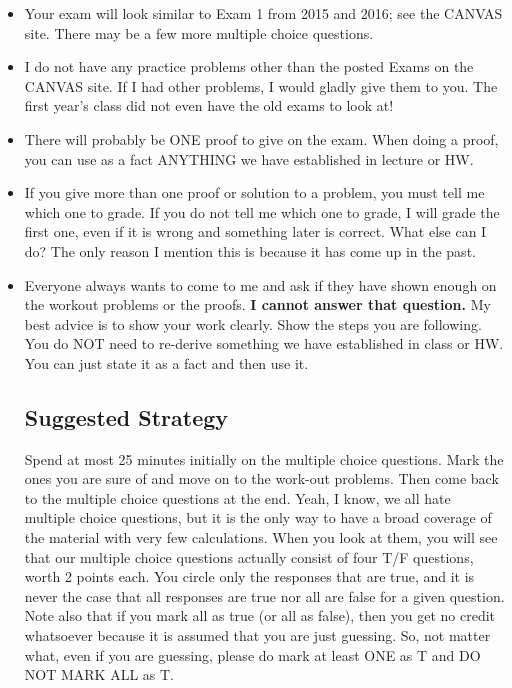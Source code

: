 \documentclass[letterpaper]{article}
\begin{document}
\begin{itemize}

\item Your exam will look similar to Exam 1 from 2015 and 2016; see the CANVAS site. There may be a few more multiple choice questions.


\item I do not have any practice problems other than the posted Exams on the CANVAS site. If I had other problems, I would gladly give them to you. The first year's class did not even have the old exams to look at!

    \item There will probably be ONE proof to give on the exam. When doing a proof, you can use as a fact ANYTHING we have established in lecture or HW.

        \item If you give more than one proof or solution to a problem, you must tell me which one to grade. If you do not tell me which one to grade, I will grade the first one, even if it is wrong and something later is correct. What else can I do? The only reason I mention this is because it has come up in the past.

        \item Everyone always wants to come to me and ask if they have shown enough on the workout problems or the proofs. \textbf{I cannot answer that question.} My best advice is to show your work clearly. Show the steps you are following. You do NOT need to re-derive something we have established in class or HW. You can just state it as a fact and then use it.

\subsection*{Suggested Strategy}

Spend at most 25 minutes initially on the multiple choice questions. Mark the ones you are sure of and move on to the work-out problems. Then come back to the multiple choice questions at the end. Yeah, I know, we all hate multiple choice questions, but it is the only way to have a broad coverage of the material with very few calculations. When you look at them, you will see that our multiple choice questions actually consist of four T/F questions, worth 2 points each. You circle only the responses that are true, and it is never the case that all responses are true nor all are false for a given question. Note also that if you mark all as true (or all as false), then you get no credit whatsoever because it is assumed that you are just guessing. So, not matter what, even if you are guessing, please do mark at least ONE as T and DO NOT MARK ALL as T.


\end{itemize}
\end{document}
